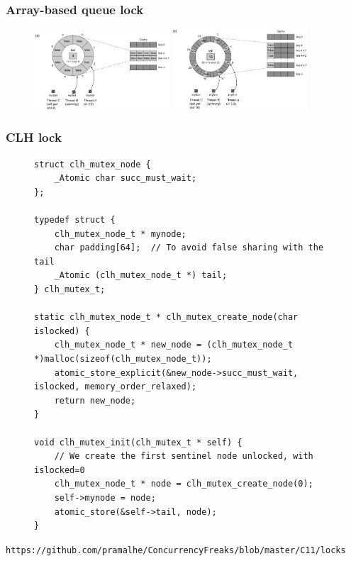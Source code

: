 \documentclass[aspectratio=169, pdf, 8pt, unicode]{beamer}
\begin{document}
\begin{frame}[fragile]
\frametitle{Array-based queue lock}
\begin{figure}[H]
\centering
\includegraphics[width=0.45\textwidth]{fig/alock_padding-a.png}
\includegraphics[width=0.45\textwidth]{fig/alock_padding-b.png}
\end{figure}
\end{frame}

\begin{frame}[fragile]
\frametitle{CLH lock}
\begin{figure}[H]
\begin{minipage}{0.8\textwidth}
\small
\begin{verbatim}
struct clh_mutex_node {
    _Atomic char succ_must_wait;
};

typedef struct {
    clh_mutex_node_t * mynode;
    char padding[64];  // To avoid false sharing with the tail
    _Atomic (clh_mutex_node_t *) tail;
} clh_mutex_t;

static clh_mutex_node_t * clh_mutex_create_node(char islocked) {
    clh_mutex_node_t * new_node = (clh_mutex_node_t *)malloc(sizeof(clh_mutex_node_t));
    atomic_store_explicit(&new_node->succ_must_wait, islocked, memory_order_relaxed);
    return new_node;
}

void clh_mutex_init(clh_mutex_t * self) {
    // We create the first sentinel node unlocked, with islocked=0
    clh_mutex_node_t * node = clh_mutex_create_node(0);
    self->mynode = node;
    atomic_store(&self->tail, node);
}
\end{verbatim}
\end{minipage}
\end{figure}
\texttt{https://github.com/pramalhe/ConcurrencyFreaks/blob/master/C11/locks}
\end{frame}
\end{document}

